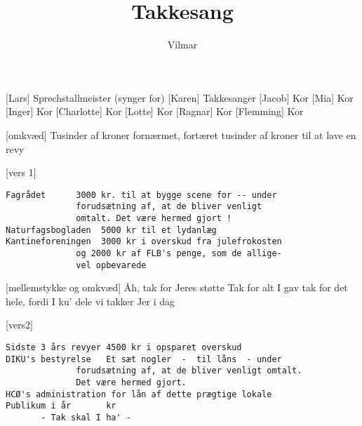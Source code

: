 \documentclass[a4paper,11pt]{article}
\title{Takkesang}
\author{Vilmar}
\begin{document}
\maketitle

\begin{roles}
[Lars] Sprechstallmeister (synger for)
[Karen] Takkesanger
[Jacob] Kor
[Mia] Kor
[Inger] Kor
[Charlotte] Kor
[Lotte] Kor
[Ragnar] Kor
[Flemming] Kor
\end{roles}



\begin{song}

[omkvæd]
Tusinder af kroner
fornærmet, fortæret
tusinder af kroner
til at lave en revy

[vers 1]
\begin{verbatim}
Fagrådet      3000 kr. til at bygge scene for -- under
              forudsætning af, at de bliver venligt
              omtalt. Det være hermed gjort !
Naturfagsbogladen  5000 kr til et lydanlæg
Kantineforeningen  3000 kr i overskud fra julefrokosten
              og 2000 kr af FLB's penge, som de allige-
              vel opbevarede
\end{verbatim}

[mellemstykke og omkvæd]
Åh, tak for Jeres støtte
Tak for alt I gav
tak for det hele, fordi I ku' dele
vi takker Jer i dag

[vers2]
\begin{verbatim}
Sidste 3 års revyer 4500 kr i opsparet overskud
DIKU's bestyrelse   Et sæt nogler  -  til låns  - under
              forudsætning af, at de bliver venligt omtalt.
              Det være hermed gjort.
HCØ's administration for lån af dette prægtige lokale
Publikum i år       kr
       - Tak skal I ha' -
\end{verbatim}
\end{song}
\end{document}
